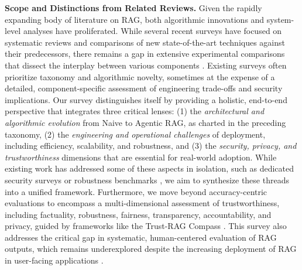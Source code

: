 \documentclass[11pt]{article}
\begin{document}
\textbf{Scope and Distinctions from Related Reviews.} Given the rapidly expanding body of literature on RAG, both algorithmic innovations and system-level analyses have proliferated. While several recent surveys have focused on systematic reviews and comparisons of new state-of-the-art techniques against their predecessors, there remains a gap in extensive experimental comparisons that dissect the interplay between various components \cite{ref74}. Existing surveys often prioritize taxonomy and algorithmic novelty, sometimes at the expense of a detailed, component-specific assessment of engineering trade-offs and security implications. Our survey distinguishes itself by providing a holistic, end-to-end perspective that integrates three critical lenses: (1) the \emph{architectural and algorithmic evolution} from Naive to Agentic RAG, as charted in the preceding taxonomy, (2) the \emph{engineering and operational challenges} of deployment, including efficiency, scalability, and robustness, and (3) the \emph{security, privacy, and trustworthiness} dimensions that are essential for real-world adoption. While existing work has addressed some of these aspects in isolation, such as dedicated security surveys \cite{ref75} or robustness benchmarks \cite{ref76}, we aim to synthesize these threads into a unified framework. Furthermore, we move beyond accuracy-centric evaluations to encompass a multi-dimensional assessment of trustworthiness, including factuality, robustness, fairness, transparency, accountability, and privacy, guided by frameworks like the Trust-RAG Compass \cite{ref77}. This survey also addresses the critical gap in systematic, human-centered evaluation of RAG outputs, which remains underexplored despite the increasing deployment of RAG in user-facing applications \cite{ref78}.
\end{document}
